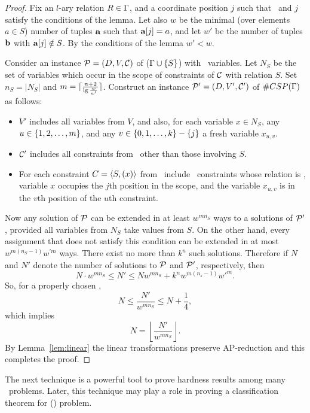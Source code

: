 \begin{proof} 
Fix an \(l\)-ary relation \(R \in \Gamma\)\@, and 
a coordinate position \(j\) such that \mR\ and \(j\) satisfy the conditions of the lemma.
Let also \(w\) be the minimal (over elements \(a\in S\)) number of tuples \(\textbf{a}\)
such that \(\textbf{a}[j]=a\), and let \(w'\) be the number of tuples \(\textbf{b}\) with
\(\textbf{a}[j] \notin S\). By the conditions of the lemma \(w'<w\)\@.

Consider an instance \(\mathcal{P}=(D,V,\mathcal{C})\) of \ccsp(\(\Gamma \cup \{{S}\}\))
with \mn\ variables. Let \(N_S\) be the set of
variables which occur in the scope of constraints of \(\mathcal{C}\) with relation \(S\)\@. 
Set \(n_S = |N_S|\) and \(m = \lceil\frac{n+2}{\lg{\frac{w}{w'}}}\rceil\)\@.
Construct an instance \(\mathcal{P}'=(D,V',\mathcal{C}')\) of \(\#CSP(\Gamma)\) as follows:
\begin{itemize}
\item
\(V'\) includes all variables from \(V\),
and also, for each variable \(x \in N_S\), any \(u \in \{{{1,2,\dotsc,m}}\}\), and any
\(v\in\{{0,1,\dotsc,k}\}-\{j\}\) a fresh variable \(x_{u,v}\)\@. 
\item 
\(\mathcal{C}'\) includes all constraints from \mconset\ other than those involving \(S\)\@. 
\item
For each constraint \(C=\langle S, (x) \rangle\) from \mconset\ include \mm\ constraints whose
relation is \mR, variable \(x\) occupies the \(j\)th position in the scope,
and the variable \(x_{u,v}\) is in the \(v\)th position of the \(u\)th constraint.
\end{itemize}

Now any solution of \(\mathcal{P}\) can be extended in at least \(w^{mn_S}\) 
ways to a solutions of \(\mathcal{P}'\)\@, provided all variables from \(N_S\)
take values from \(S\)\@. On the other hand, every assignment that does not satisfy this
condition can be extended in at most \(w^{m(n_S-1)}w^{\prime m}\) ways.
There exist no more than \(k^n\) such solutions. Therefore if \(N\) and \(N'\)
denote the number of solutions to \(\mathcal{P}\) and \(\mathcal{P}'\), respectively, then
\[N\cdot w^{mn_S} \le N' \le Nw^{mn_S} + k^nw^{m(n_s-1)}w'^m.\]
So, for a properly chosen \mm, 
\[N \le \frac{N'}{w^{mn_S}} \le N + \frac{1}{4},\]
which implies
\[N = \left\lfloor \frac{N'}{w^{mn_S}} \right\rfloor.\]
By Lemma~\ref{lem:linear} the linear transformations preserve AP-reduction
and this completes the proof.
\end{proof}


The next technique is a powerful tool to prove hardness results among many \ccsp\ problems.
Later, this technique may play a role in proving a classification theorem for \ccsp(\mrelset)
problem.

